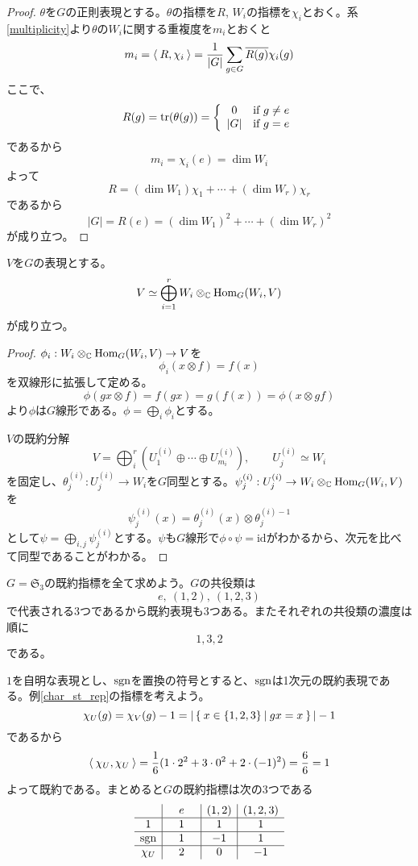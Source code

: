 \documentclass{ltjsreport}
\begin{document}
\begin{proof}
  $\theta$を$G$の正則表現とする。$\theta$の指標を$R$, $W_i$の指標を$\chi_i$とおく。系\ref{multiplicity}より$\theta$の$W_i$に関する重複度を$m_i$とおくと
  \[
  m_i=\langle\:R,\chi_i\:\rangle=\frac{1}{|G|}\sum_{g\in G}\overline{R(g)}\chi_i(g)
  \]
  ここで、
  \[
  R(g)=\text{tr}(\theta(g))=\left\{\begin{array}{cl}
    0 & \text{if $g\neq e$}\\
    |G| & \text{if $g=e$}
  \end{array}\right.  
  \]
  であるから
  \[
  m_i=\chi_i(e)=\dim W_i  
  \]
  よって
  \[
  R=(\dim W_1)\chi_1+\cdots +(\dim W_r)\chi_r  
  \]
  であるから
  \[
  |G|=R(e)=(\dim W_1)^2+\cdots +(\dim W_r)^2  
  \]
  が成り立つ。
\end{proof}


\begin{prop}\label{multi_space}
  $V$を$G$の表現とする。
  \[
  V\simeq \bigoplus_{i=1}^rW_i\otimes_{\mathbb{C}} \text{Hom}_G(W_i,V)  
  \]
  が成り立つ。
\end{prop}

\begin{proof}
  $\phi_i:W_i\otimes_{\mathbb{C}}\text{Hom}_G(W_i,V)\rightarrow V$を
  \[
  \phi_i(x\otimes f)=f(x)  
  \]
  を双線形に拡張して定める。
  \[
  \phi(gx\otimes f)=f(gx)=g(f(x))=\phi(x\otimes gf)  
  \]
  より$\phi$は$G$線形である。$\phi=\bigoplus_{i}\phi_i$とする。
  
  $V$の既約分解
  \[
    V=\bigoplus_i^r (U_1^{(i)}\oplus\cdots\oplus U_{m_i}^{(i)}),\qquad U^{(i)}_j\simeq W_i
  \]
  を固定し、$\theta^{(i)}_j:U^{(i)}_j\rightarrow W_i$を$G$同型とする。$\psi^{(i)}_j:U^{(i)}_j\rightarrow W_i\otimes_{\mathbb{C}} \text{Hom}_G(W_i,V) $を
  \[
  \psi^{(i)}_j(x)=\theta^{(i)}_j(x)\otimes \theta^{(i)-1}_j
  \]
  として$\psi=\bigoplus_{i,j}\psi^{(i)}_j$とする。$\psi$も$G$線形で$\phi\circ\psi=\text{id}$がわかるから、次元を比べて同型であることがわかる。
\end{proof}


\begin{eg}\label{S3}
  $G=\mathfrak{S}_3$の既約指標を全て求めよう。$G$の共役類は
  \[
  e,\:(1,2),\:(1,2,3)  
  \]
  で代表される3つであるから既約表現も3つある。またそれぞれの共役類の濃度は順に
  \[
  1,3,2  
  \]
  である。

  $1$を自明な表現とし、$\mathrm{sgn}$を置換の符号とすると、$\mathrm{sgn}$は1次元の既約表現である。例\ref{char_st_rep}の指標を考えよう。
  \[
  \chi_U(g)=\chi_V(g)-1=|\left\{\:x\in\{1,2,3\}\:\middle|\:gx=x\:\right\}|-1  
  \]
  であるから
  \[
  \langle\:\chi_U,\chi_U\:\rangle=\frac{1}{6}(1\cdot 2^2+3\cdot 0^2+2\cdot (-1)^2)=\frac{6}{6}=1 
  \]
  よって既約である。まとめると$G$の既約指標は次の3つである
  \[
  \begin{array}{c|c|c|c}
        &\quad e\quad & (1,2) & (1,2,3) \\ \hline
    1   &      1      &   1   &    1    \\ \hline
  \mathrm{sgn}  &      1      &   -1  &    1    \\ \hline
  \chi_U&      2      &   0   &    -1
  \end{array}
  \]
\end{eg}
\end{document}
